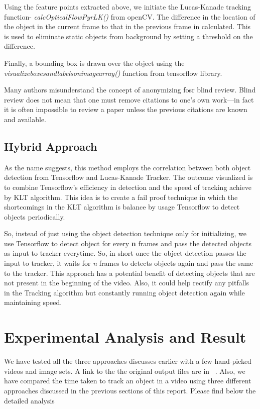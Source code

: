 \documentclass[10pt,twocolumn,letterpaper]{article}
\begin{document}
Using the feature points extracted above, we initiate the Lucas-Kanade tracking function- \textit{calcOpticalFlowPyrLK()} from openCV. The difference in the location of the object in the current frame to that in the previous frame in calculated. This is used to eliminate static objects from background by setting a threshold on the difference. 

Finally, a bounding box is drawn over the object using the \textit{visualize\textunderscore boxes\textunderscore and\textunderscore labels\textunderscore on\textunderscore image\textunderscore array()}  function from tensorflow library.

Many authors misunderstand the concept of anonymizing fosr blind
review.  Blind review does not mean that one must remove
citations to one's own work---in fact it is often impossible to
review a paper unless the previous citations are known and
available.

\subsection{Hybrid Approach}
As the name suggests, this method employs the correlation between both object detection from Tensorflow and Lucas-Kanade Tracker. The outcome visualized is to combine Tensorflow's efficiency in detection and the speed of tracking achieve by KLT algorithm. This idea is to create a fail proof technique in which the shortcomings in the KLT algorithm is balance by usage Tensorflow to detect objects periodically.

So, instead of just using the object detection technique only for initializing, we use Tensorflow to detect object for every \textbf{n} frames and pass the detected objects as input to tracker everytime. So, in short once the object detection passes the input to tracker, it waits for \textit{n} frames to detects objects again and pass the same to the tracker. This approach has a potential benefit of detecting objects that are not present in the beginning of the video. Also, it could help rectify any pitfalls in the Tracking algorithm but constantly running object detection again while maintaining speed.

\section{Experimental Analysis and Result}

We have tested all the three approaches discusses earlier with a few hand-picked videos and image sets. A link to the the original output files are in ~\cite{Videolink}. Also, we have compared the time taken to track an object in a video using three different approaches discussed in the previous sections of this report. Please find below the detailed analysis
\end{document}
